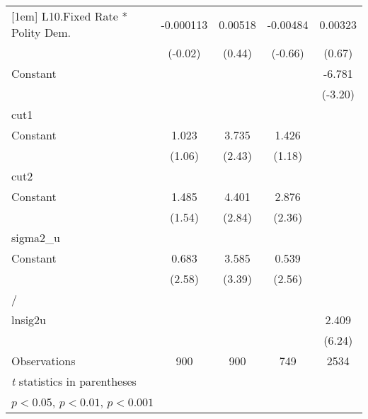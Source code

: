 {\begin{longtable}{l*{4}{c}}
[1em]
L10.Fixed Rate * Polity Dem.&-0.000113         &  0.00518         & -0.00484         &  0.00323         \\
                &  (-0.02)         &   (0.44)         &  (-0.66)         &   (0.67)         \\
[1em]
Constant        &                  &                  &                  &   -6.781\sym{**} \\
                &                  &                  &                  &  (-3.20)         \\
\hline
cut1            &                  &                  &                  &                  \\
Constant        &    1.023         &    3.735\sym{*}  &    1.426         &                  \\
                &   (1.06)         &   (2.43)         &   (1.18)         &                  \\
\hline
cut2            &                  &                  &                  &                  \\
Constant        &    1.485         &    4.401\sym{**} &    2.876\sym{*}  &                  \\
                &   (1.54)         &   (2.84)         &   (2.36)         &                  \\
\hline
sigma2\_u        &                  &                  &                  &                  \\
Constant        &    0.683\sym{**} &    3.585\sym{***}&    0.539\sym{*}  &                  \\
                &   (2.58)         &   (3.39)         &   (2.56)         &                  \\
\hline
/               &                  &                  &                  &                  \\
lnsig2u         &                  &                  &                  &    2.409\sym{***}\\
                &                  &                  &                  &   (6.24)         \\
\hline
Observations    &      900         &      900         &      749         &     2534         \\
\hline\hline
\multicolumn{5}{l}{\footnotesize \textit{t} statistics in parentheses}\\
\multicolumn{5}{l}{\footnotesize \sym{*} \(p<0.05\), \sym{**} \(p<0.01\), \sym{***} \(p<0.001\)}\\
\end{longtable}
}
